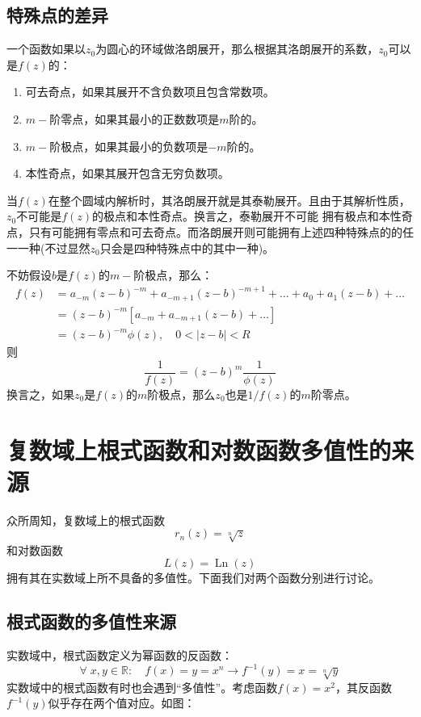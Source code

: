\documentclass[12pt, a4paper, oneside]{ctexart}
\newcommand{\F}[1][z]
{\ensuremath{f(#1)}}
\begin{document}
\subsection{特殊点的差异}
一个函数如果以$z_0$为圆心的环域做洛朗展开，那么根据其洛朗展开的系数，$z_0$可以是$f(z)$的：
\begin{enumerate}
    \item 可去奇点，如果其展开不含负数项且包含常数项。
    \item $m-$阶零点，如果其最小的正数数项是$m$阶的。
    \item $m-$阶极点，如果其最小的负数项是$-m$阶的。
    \item 本性奇点，如果其展开包含无穷负数项。
\end{enumerate}
当$f(z)$在整个圆域内解析时，其洛朗展开就是其泰勒展开。且由于其解析性质，$z_0$不可能是$f(z)$的极点和本性奇点。换言之，泰勒展开不可能
拥有极点和本性奇点，只有可能拥有零点和可去奇点。而洛朗展开则可能拥有上述四种特殊点的的任一一种(不过显然$z_0$只会是四种特殊点中的其中一种)。

不妨假设$b$是$\F$的$m-$阶极点，那么：
$$
\begin{aligned}
f(z) &=a_{-m}(z-b)^{-m}+a_{-m+1}(z-b)^{-m+1}+\ldots+a_{0}+a_{1}(z-b)+\ldots \\
&=(z-b)^{-m}\left[a_{-m}+a_{-m+1}(z-b)+\ldots\right] \\
&=(z-b)^{-m} \phi(z), \quad 0<|z-b|<R
\end{aligned}
$$
则
$$
\frac{1}{f(z)}=(z-b)^{m} \frac{1}{\phi(z)}
$$
换言之，如果$z_0$是$\F$的$m$阶极点，那么$z_0$也是$1/\F$的$m$阶零点。

\section{复数域上根式函数和对数函数多值性的来源}
众所周知，复数域上的根式函数
$$
r_n(z)=\sqrt[n]{z}
$$
和对数函数
$$
L(z)=\operatorname{Ln}(z)
$$
拥有其在实数域上所不具备的多值性。下面我们对两个函数分别进行讨论。
\subsection{根式函数的多值性来源}
实数域中，根式函数定义为幂函数的反函数：
$$\forall\; x,y\in \mathbb{R}:\quad f(x)=y=x^n \to f^{-1}(y)=x=\sqrt[n]{y}$$
实数域中的根式函数有时也会遇到“多值性”。考虑函数$f(x)=x^2$，其反函数$f^{-1}(y)$似乎存在两个值对应。如图：
\end{document}
